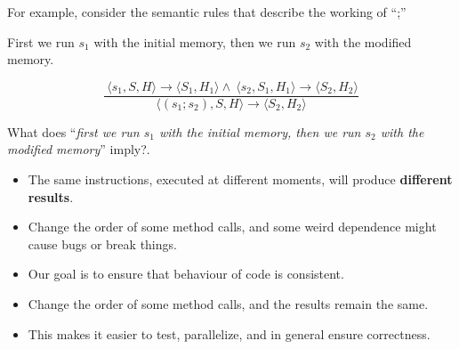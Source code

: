 \documentclass{beamer}
\begin{document}
\begin{frame}[fragile]{\CurrentSection}
\begin{exampleblock}{}
For example, consider the semantic rules that describe the working of ``;''
\end{exampleblock}

 
\begin{exampleblock}{}
First we run $s_1$ with the initial memory, then we run $s_2$ with the modified memory.
\end{exampleblock}

 
\pause 
$$\frac{\ \langle s_1,S,H \rangle \rightarrow \langle S_1,H_1 \rangle\wedge\ \langle s_2,S_1,H_1 \rangle \rightarrow \langle S_2,H_2 \rangle}{\langle (s_1;s_2),S,H \rangle \rightarrow \langle S_2,H_2 \rangle}$$
 

\end{frame}

\begin{frame}[fragile]{\CurrentSection}
\begin{exampleblock}{}
What does ``\textit{first we run $s_1$ with the initial memory, then we run $s_2$ with the modified memory}'' imply?.
\end{exampleblock}

 
\pause 
\begin{exampleblock}{}
\begin{itemize}
\item The same instructions, executed at different moments, will produce \textbf{different results}.
\item Change the order of some method calls, and some weird dependence might cause bugs or break things.

\end{itemize}

\end{exampleblock}

 

\end{frame}

\begin{frame}[fragile]{\CurrentSection}
\begin{block}{\CurrentSubSection}
\begin{itemize}
\item Our goal is to ensure that behaviour of code is consistent.
\item Change the order of some method calls, and the results remain the same.
\item This makes it easier to test, parallelize, and in general ensure correctness.

\end{itemize}

\end{block}


\end{frame}
\end{document}
